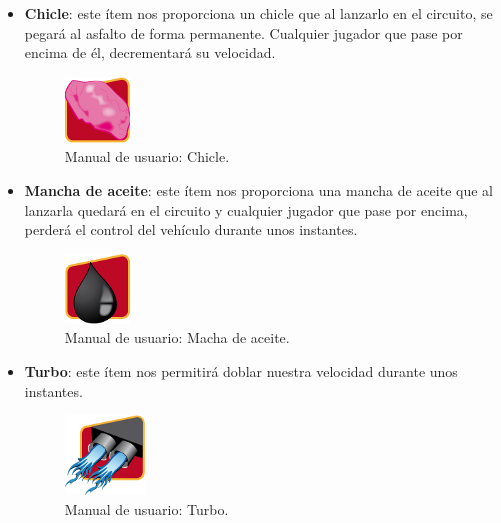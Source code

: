 \begin{itemize}
    \item \textbf{Chicle}: este ítem nos proporciona un chicle que al lanzarlo en el circuito, se pegará al asfalto de forma 
    permanente. Cualquier jugador que pase por encima de él, decrementará su velocidad.
        \begin{figure}[H]
          \label{chicle}
          \begin{center}
            \includegraphics[scale=1]{imagenes/items/gum.png}
          \end{center}
         \caption{Manual de usuario: Chicle.}
        \end{figure}
        
    \item \textbf{Mancha de aceite}: este ítem nos proporciona una mancha de aceite que al lanzarla quedará en el circuito y 
    cualquier jugador que pase por encima, perderá el control del vehículo durante unos instantes.
        \begin{figure}[H]
          \label{mancha_aceite}
          \begin{center}
            \includegraphics[scale=1]{imagenes/items/oil.png}
          \end{center}
         \caption{Manual de usuario: Macha de aceite.}
        \end{figure}
    
    \item \textbf{Turbo}: este ítem nos permitirá doblar nuestra velocidad durante unos instantes.
        \begin{figure}[H]
          \label{turbo}
          \begin{center}
            \includegraphics[scale=1]{imagenes/items/turbo.png}
          \end{center}
         \caption{Manual de usuario: Turbo.}
        \end{figure}
        
\end{itemize}

